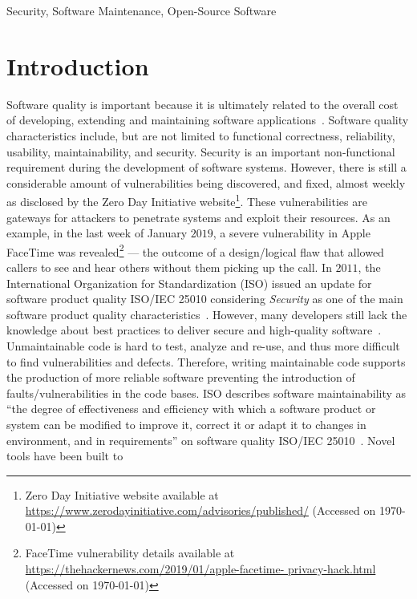 \documentclass[10pt,conference]{IEEEtran}
\newcommand\Sof[1]{\nb{Sofia}{red}{#1}}
\begin{document}
\begin{IEEEkeywords}
Security, Software Maintenance, Open-Source Software
\end{IEEEkeywords}

\section{Introduction}
%
Software quality is important because it is ultimately related to the overall
cost of developing, extending and maintaining software applications~\cite{slaughter1998evaluating}. 
Software quality characteristics include, but are not limited to functional correctness,
reliability, usability, maintainability, and security. Security is an 
important non-functional requirement during the development of software systems. 
However, there is still a considerable amount of vulnerabilities being
discovered, and fixed, almost weekly as disclosed by the Zero Day Initiative
website\footnote{Zero Day Initiative website available at
\url{https://www.zerodayinitiative.com/advisories/published/} (Accessed on \today{})}.
These vulnerabilities are gateways for attackers to penetrate systems and 
exploit their resources. \Sof{Improve example - outdated}As an example, in the last week of January $2019$, 
a severe vulnerability in Apple FaceTime was revealed\footnote{FaceTime vulnerability 
details available at \url{https://thehackernews.com/2019/01/apple-facetime-
privacy-hack.html} (Accessed on \today{})} --- the outcome of a design/logical
flaw that allowed callers to see and hear others without them picking up the call.%
%
In $2011$, the International Organization for Standardization (ISO) issued an
update for software product quality ISO/IEC 25010 considering
\emph{Security} as one of the main software product quality characteristics~\cite{iso:2011}. 
However, many developers still lack the knowledge about best practices to deliver secure and high-quality software~\cite{Pothamsetty:2005:SEL:1107622.1107635, 8077802}.
Unmaintainable code is hard to test, analyze and re-use, and thus more difficult
to find vulnerabilities and defects. Therefore, writing maintainable code
supports the production of more reliable software preventing the introduction of 
faults/vulnerabilities in the code bases. ISO describes software 
maintainability as ``the degree of effectiveness and
efficiency with which a software product or system can be modified to improve
it, correct it or adapt it to changes in environment, and in requirements'' on
software quality ISO/IEC 25010~\cite{iso:2011}. Novel tools have been built to 
\end{document}
